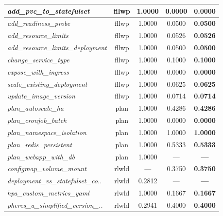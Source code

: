 \begin{footnotesize}
\begin{longtable}{|p{3.6cm}|c|c|c|c|}
\hline
\textit{add\_\allowbreak{}pvc\_\allowbreak{}to\_\allowbreak{}statefulset} & fllwp & 1.0000 & 0.0000 & \textbf{0.0000} \\
\hline
\textit{add\_\allowbreak{}readiness\_\allowbreak{}probe} & fllwp & 1.0000 & 0.0500 & \textbf{0.0500} \\
\hline
\textit{add\_\allowbreak{}resource\_\allowbreak{}limits} & fllwp & 1.0000 & 0.0526 & \textbf{0.0526} \\
\hline
\textit{add\_\allowbreak{}resource\_\allowbreak{}limits\_\allowbreak{}deployment} & fllwp & 1.0000 & 0.0500 & \textbf{0.0500} \\
\hline
\textit{change\_\allowbreak{}service\_\allowbreak{}type} & fllwp & 1.0000 & 0.1000 & \textbf{0.1000} \\
\hline
\textit{expose\_\allowbreak{}with\_\allowbreak{}ingress} & fllwp & 1.0000 & 0.0000 & \textbf{0.0000} \\
\hline
\textit{scale\_\allowbreak{}existing\_\allowbreak{}deployment} & fllwp & 1.0000 & 0.0625 & \textbf{0.0625} \\
\hline
\textit{update\_\allowbreak{}image\_\allowbreak{}version} & fllwp & 1.0000 & 0.0714 & \textbf{0.0714} \\
\hline
\textit{plan\_\allowbreak{}autoscale\_\allowbreak{}ha} & plan & 1.0000 & 0.4286 & \textbf{0.4286} \\
\hline
\textit{plan\_\allowbreak{}cronjob\_\allowbreak{}batch} & plan & 1.0000 & 0.0000 & \textbf{0.0000} \\
\hline
\textit{plan\_\allowbreak{}namespace\_\allowbreak{}isolation} & plan & 1.0000 & 1.0000 & \textbf{1.0000} \\
\hline
\textit{plan\_\allowbreak{}redis\_\allowbreak{}persistent} & plan & 1.0000 & 0.5333 & \textbf{0.5333} \\
\hline
\textit{plan\_\allowbreak{}webapp\_\allowbreak{}with\_\allowbreak{}db} & plan & 1.0000 & --- & \textbf{---} \\
\hline
\textit{configmap\_\allowbreak{}volume\_\allowbreak{}mount} & rlwld & --- & 0.3750 & \textbf{0.3750} \\
\hline
\textit{deployment\_\allowbreak{}vs\_\allowbreak{}statefulset\_\allowbreak{}co..} & rlwld & 0.2812 & --- & \textbf{---} \\
\hline
\textit{hpa\_\allowbreak{}custom\_\allowbreak{}metrics\_\allowbreak{}yaml} & rlwld & 1.0000 & 0.1667 & \textbf{0.1667} \\
\hline
\textit{pheres\_\allowbreak{}a\_\allowbreak{}simplified\_\allowbreak{}version\_\allowbreak{}..} & rlwld & 0.2941 & 0.4000 & \textbf{0.4000} \\

\end{longtable}
\end{footnotesize}
